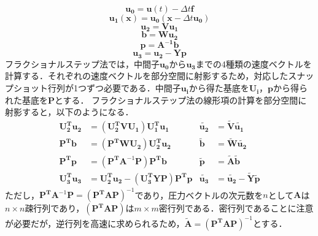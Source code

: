 \documentclass[a4j,12pt]{jreport}
\begin{document}
\[
	\bm{u_0} =  \bm{u} (t)  - \varDelta t \bm{f} 	
\]
\[
	\bm{u_1}(\bm{x}) = \bm{u_0}(\bm{x}  - \varDelta t \bm{u_0})
\]
\[
	\bm{u_2}   =  \bm{V}\bm{u_1}
\]
\[
	\bm{b} = \bm{W}\bm{u_2}
\]
\[
	\bm{p} = \bm{A^{-1}}\bm{b}
\]
\[
	\bm{u_3}  =  \bm{u_2} - \bm{Y}\bm{p} 
\]
フラクショナルステップ法では，中間子$\bm{u_0}$から$\bm{u_3}$までの4種類の速度ベクトルを計算する．それぞれの速度ベクトルを部分空間に射影するため，対応したスナップショット行列が1つずつ必要である．中間子$\bm{u_i}$から得た基底を$\bm{U_i}$，$\bm{p}$から得られた基底を$\bm{P}$とする．
フラクショナルステップ法の線形項の計算を部分空間に射影すると，以下のようになる．
\begin{align*}
 \bm{U_2^T}\bm{u_2}	& = (\bm{U_2^T}\bm{V}\bm{U_1})\bm{U_1^T}\bm{u_1} 					&\bm{\tilde{u_2}} 		&= \bm{\tilde{V}}\bm{\tilde{u_1}}	\\
 \bm{P^T}\bm{b}		& = (\bm{P^T}\bm{W}\bm{U_2})\bm{U_2^T}\bm{u_2}        				&\bm{\tilde{b}}			&= \bm{\tilde{W}}\bm{\tilde{u_2}}	\\
 \bm{P^T}\bm{p} 		&= (\bm{P^T}\bm{A}^{-1}\bm{P})\bm{P^T}\bm{b}						&\bm{\tilde{p}}			&= \bm{\tilde{A}}\bm{\tilde{b}}\\
 \bm{U_3^T}\bm{u_3} 	&=  \bm{U_2^T}\bm{u_2} - (\bm{U_3^T}\bm{Y}\bm{P})\bm{P^T}\bm{p}	&\bm{\tilde{u_3}}		&= \bm{\tilde{u_2}}  -  \bm{\tilde{Y}}\bm{\tilde{p}}
\end{align*}
ただし，$\bm{P^T}\bm{A}^{-1}\bm{P} = (\bm{P^T}\bm{A}\bm{P})^{-1}$であり，圧力ベクトルの次元数を$n$として$\bm{A}$は$n\times n$疎行列であり，$(\bm{P^T}\bm{A}\bm{P})$は$m\times m$密行列である．密行列であることに注意が必要だが，逆行列を高速に求められるため，$\bm{\tilde{A}} = (\bm{P^T}\bm{A}\bm{P})^{-1}$とする．
\end{document}
